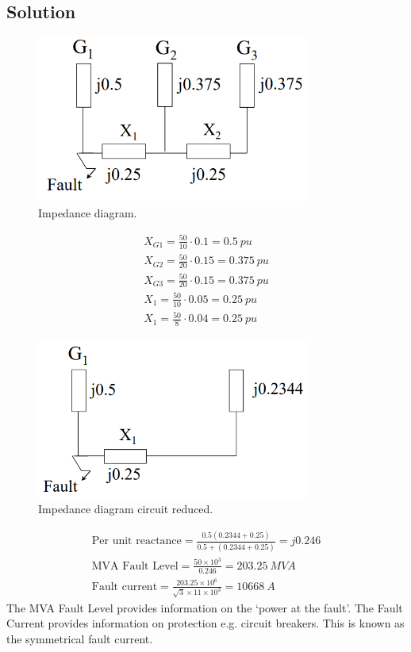 \subsection{Solution}
\begin{figure}[H]
	\centering
	\includegraphics[width = 0.8\textwidth]{./img/figure18.png}
	\caption{Impedance diagram.}
\end{figure}
\begin{gather}
	X_{G1} = \frac{50}{10}\cdot 0.1 = \SI{0.5}{pu}\\
	X_{G2} = \frac{50}{20}\cdot 0.15 = \SI{0.375}{pu}\\
	X_{G3} = \frac{50}{20}\cdot 0.15 = \SI{0.375}{pu}\\
	X_1 = \frac{50}{10}\cdot 0.05 = \SI{0.25}{pu}\\
	X_1 = \frac{50}{8}\cdot 0.04 = \SI{0.25}{pu}
\end{gather}
\begin{figure}[H]
	\centering
	\includegraphics[width = 0.8\textwidth]{./img/figure19.png}
	\caption{Impedance diagram circuit reduced.}
\end{figure}
\begin{gather}
	\textrm{Per unit reactance} = \frac{0.5\left(0.2344 + 0.25\right)}{0.5 + \left(0.2344 + 0.25\right)} = j0.246\\
	\textrm{MVA Fault Level} = \frac{50\times 10^3}{0.246} = \SI{203.25}{MVA}\\
	\textrm{Fault current} = \frac{203.25 \times 10^6}{\sqrt{3}\times 11\times 10^3} = \SI{10668}{A}
\end{gather}
The MVA Fault Level provides information on the `power at the fault'. The Fault Current provides information on protection e.g. circuit breakers. This is known as the symmetrical fault current.
